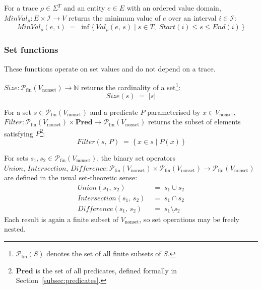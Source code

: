 \begin{definition}\label{def:min_val}
    For a trace $\rho \in \Sigma^T$ and an entity $e \in E$ with an ordered value domain,
    $\mathit{MinVal}_\rho : E \times \mathcal{I} \rightarrow V$ returns the minimum value of $e$ over an interval $i \in \mathcal{I}$:
    \[
        \mathit{MinVal}_\rho(e,\, i) \;=\; \inf\{\, \mathit{Val}_\rho(e,\, s) \mid s \in T,\; \mathit{Start}(i) \leq s \leq \mathit{End}(i) \,\}
    \]
\end{definition}

\subsubsection{Set functions}\label{subsec:set_fns}

These functions operate on set values and do not depend on a trace.

\begin{definition}\label{def:size}
    $\mathit{Size} : \mathcal{P}_{\text{fin}}(V_{\text{nonset}}) \rightarrow \mathbb{N}$ returns the cardinality of a set\footnote{$\mathcal{P}_{\text{fin}}(S)$ denotes the set of all finite subsets of $S$.}:
    \[
        \mathit{Size}(s) \;=\; |s|
    \]
\end{definition}

\begin{definition}\label{def:filter}
    For a set $s \in \mathcal{P}_{\text{fin}}(V_{\text{nonset}})$ and a predicate $P$ parameterised by $x \in V_{\text{nonset}}$,
    $\mathit{Filter} : \mathcal{P}_{\text{fin}}(V_{\text{nonset}}) \times \mathbf{Pred} \rightarrow \mathcal{P}_{\text{fin}}(V_{\text{nonset}})$ returns the subset of elements satisfying $P$\footnote{$\mathbf{Pred}$ is the set of all predicates, defined formally in Section~\ref{subsec:predicates}.}:
    \[
        \mathit{Filter}(s,\, P) \;=\; \{\, x \in s \mid P(x) \,\}
    \]
\end{definition}

\begin{definition}\label{def:set_ops}
    For sets $s_1, s_2 \in \mathcal{P}_{\text{fin}}(V_{\text{nonset}})$, the binary set operators
    $\mathit{Union},\, \mathit{Intersection},\, \mathit{Difference} : \mathcal{P}_{\text{fin}}(V_{\text{nonset}}) \times \mathcal{P}_{\text{fin}}(V_{\text{nonset}}) \rightarrow \mathcal{P}_{\text{fin}}(V_{\text{nonset}})$
    are defined in the usual set-theoretic sense:
    \begin{align*}
        \mathit{Union}(s_1,\, s_2)        & \;=\; s_1 \cup s_2      \\
        \mathit{Intersection}(s_1,\, s_2) & \;=\; s_1 \cap s_2      \\
        \mathit{Difference}(s_1,\, s_2)   & \;=\; s_1 \setminus s_2
    \end{align*}
    Each result is again a finite subset of $V_{\text{nonset}}$, so set operations may be freely nested.
\end{definition}

